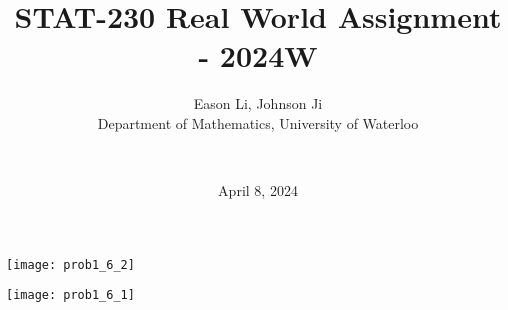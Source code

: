 \documentclass[final]{beamer}
\title{STAT-230 Real World Assignment - 2024W}
\author{
    Eason Li, Johnson Ji \\
    Department of Mathematics, University of Waterloo \and \\
}
\date{April 8, 2024} %
\begin{document}
\maketitle


\begin{minipage}{.5\textwidth}
    \centering
    \texttt{[image: prob1\_6\_2]}
    \caption{$dt=0.1$}
    \label{fig:prob1_6_2}
\end{minipage}%
\begin{minipage}{0.5\textwidth}
    \centering
    \texttt{[image: prob1\_6\_1]}
    \caption{$dt =$}
    \label{fig:prob1_6_1}
\end{minipage}
\end{document}
